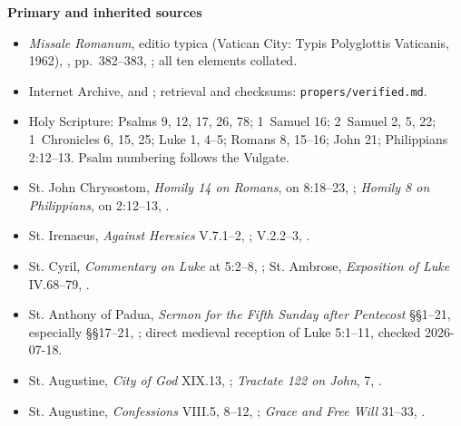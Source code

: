 \begin{deepstudy}
\textbf{Primary and inherited sources}
{\footnotesize
\begin{itemize}[itemsep=0em,topsep=0.15em,parsep=0pt]
\item \emph{Missale Romanum}, editio typica (Vatican City: Typis Polyglottis Vaticanis, 1962), , pp.~382--383, ; all ten elements collated.
\item Internet Archive,  and ; retrieval and checksums: \texttt{propers/verified.md}.
\item Holy Scripture: Psalms 9, 12, 17, 26, 78; 1~Samuel 16; 2~Samuel 2, 5, 22; 1~Chronicles 6, 15, 25; Luke 1, 4--5; Romans 8, 15--16; John 21; Philippians 2:12--13. Psalm numbering follows the Vulgate.
\item St. John Chrysostom, \emph{Homily 14 on Romans}, on 8:18--23, ; \emph{Homily 8 on Philippians}, on 2:12--13, .
\item St. Irenaeus, \emph{Against Heresies} V.7.1--2, ; V.2.2--3, .
\item St. Cyril, \emph{Commentary on Luke} at 5:2--8, ; St. Ambrose, \emph{Exposition of Luke} IV.68--79, .
\item St. Anthony of Padua, \emph{Sermon for the Fifth Sunday after Pentecost} §§1--21, especially §§17--21, ; direct medieval reception of Luke 5:1--11, checked 2026-07-18.
\item St. Augustine, \emph{City of God} XIX.13, ; \emph{Tractate 122 on John}, 7, .
\item St. Augustine, \emph{Confessions} VIII.5, 8--12, ; \emph{Grace and Free Will} 31--33, .

\end{itemize}}
\end{deepstudy}
